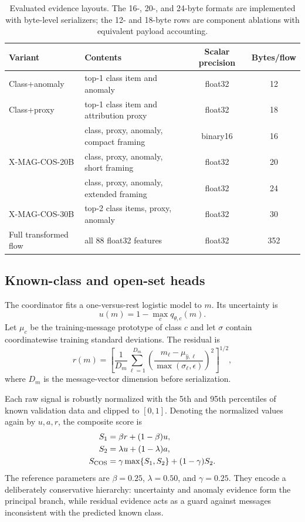 \begin{table}[H]
\caption{Evaluated evidence layouts. The 16-, 20-, and 24-byte formats are implemented with byte-level serializers; the 12- and 18-byte rows are component ablations with equivalent payload accounting.}
\label{tab:encodings}
\centering
\small
\begin{tabular}{L{0.19\textwidth}L{0.43\textwidth}cc}
\toprule
Variant & Contents & Scalar precision & Bytes/flow \\
\midrule
Class+anomaly & top-1 class item and anomaly & float32 & 12 \\
Class+proxy & top-1 class item and attribution proxy & float32 & 18 \\
\compactmethod{} & class, proxy, anomaly, compact framing & binary16 & 16 \\
X-MAG-COS-20B & class, proxy, anomaly, short framing & float32 & 20 \\
 & class, proxy, anomaly, extended framing & float32 & 24 \\
X-MAG-COS-30B & top-2 class items, proxy, anomaly & float32 & 30 \\
Full transformed flow & all 88 float32 features & float32 & 352 \\
\bottomrule
\end{tabular}
\end{table}

\subsection{Known-class and open-set heads}

The coordinator fits a one-versus-rest logistic model to $m$. Its uncertainty is
\begin{equation}
u(m)=1-\max_c q_{\theta,c}(m).
\end{equation}
Let $\mu_c$ be the training-message prototype of class $c$ and let $\sigma$ contain coordinatewise training standard deviations. The residual is
\begin{equation}
r(m)=\left[\frac{1}{D_m}\sum_{\ell=1}^{D_m}
\left(\frac{m_\ell-\mu_{\widehat{y},\ell}}{\max(\sigma_\ell,\epsilon)}\right)^2\right]^{1/2},
\label{eq:residual}
\end{equation}
where $D_m$ is the message-vector dimension before serialization.

Each raw signal is robustly normalized with the 5th and 95th percentiles of known validation data and clipped to $[0,1]$. Denoting the normalized values again by $u,a,r$, the composite score is
\begin{align}
S_1 &= \beta r+(1-\beta)u, \label{eq:s1}\\
S_2 &= \lambda u+(1-\lambda)a, \label{eq:s2}\\
S_{\rm COS} &= \gamma\max\{S_1,S_2\}+(1-\gamma)S_2.
\label{eq:cos}
\end{align}
The reference parameters are $\beta=0.25$, $\lambda=0.50$, and $\gamma=0.25$. They encode a deliberately conservative hierarchy: uncertainty and anomaly evidence form the principal branch, while residual evidence acts as a guard against messages inconsistent with the predicted known class.

